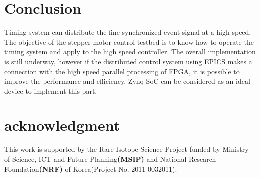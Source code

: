 \documentclass[a4paper,
              ]{jacow}
\newcommand\SEC[1]{\textbf{\uppercase{#1}}}
\begin{document}
\newpage
\section{Conclusion}
Timing system can distribute the fine synchronized event signal at a high speed. The objective of the stepper motor control testbed is to know how to operate the timing system and apply to the high speed controller. The overall implementation is still underway, however if the distributed control system using EPICS makes a connection with the high speed parallel processing of FPGA, it is possible to improve the performance and efficiency. Zynq SoC can be considered as an ideal device to implement this part.

\section{acknowledgment}
This work is supported by the Rare Isotope Science Project funded by Ministry of Science, ICT and Future Planning\SEC{(MSIP)} and National Research Foundation\SEC{(NRF)} of Korea(Project No. 2011-0032011).

%
%
\iftrue   %
	\raggedend
\fi

\iffalse  %
	\printbibliography

\else
\end{document}
